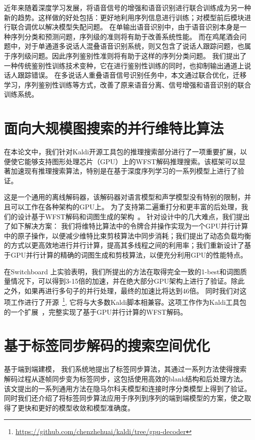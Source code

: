 近年来随着深度学习发展，将语音信号的增强和语音识别进行联合训练成为另一种新的趋势。这样做的好处包括：更好地利用序列信息进行训练；对模型前后模块进行联合调优以解决模型失配问题。
%
在单输出语音识别中，由于语音识别本身是一种序列分类和预测问题，序列级的准则将有助于改善系统性能。
而在鸡尾酒会问题中，对于单通道多说话人混叠语音识别系统，则又包含了说话人跟踪问题，也属于序列级问题。因此序列鉴别性准则将有助于这样的序列分类问题。
我们提出了一种传统鉴别性训练技术变种，它在进行鉴别性训练的同时，也抑制输出通道上说话人跟踪错误。
在多说话人重叠语音信号识别任务中，本文通过联合优化，迁移学习，序列鉴别性训练等方式，改善了原来语音分离、信号增强和语音识别的联合训练系统。


\section{面向大规模图搜索的并行维特比算法}
\label{chap:sum-gpu}

在本论文中，我们针对Kaldi开源工具包的推理搜索部分进行了一项重要扩展，以便使它能够支持图形处理芯片（GPU）上的WFST解码推理搜索。该框架可以显著加速现有推理搜索算法，特别是在基于深度序列学习的一系列模型上进行了验证。

这是一个通用的离线解码器，该解码器对语言模型和声学模型没有特别的限制，并且可以工作在各种架构的GPU上。
为了支持第二遍重打分和更丰富的后处理，我们的设计基于WFST解码和词图生成的架构~\cite{povey2012generating}。
针对设计中的几大难点，我们提出了如下解决方案：
我们将维特比算法中的令牌合并操作实现为一个GPU并行计算中的原子操作，以便减少维特比束剪枝算法中同步消耗；我们提出了动态负载均衡的方式以更高效地进行并行计算，提高其多线程之间的利用率；我们重新设计了基于GPU并行计算的精确的词图生成和剪枝算法，以便充分利用GPU的性能特点。


在Switchboard 上实验表明，我们所提出的方法在取得完全一致的1-best和词图质量情况下，可以得到3-15倍的加速，并在绝大部分GPU架构上进行了验证。除此之外，如果再进行多句子的并行处理，最终的加速比将达到46倍。
同时我们对这项工作进行了开源~\footnote{\url{https://github.com/chenzhehuai/kaldi/tree/gpu-decoder}},
它将与大多数Kaldi脚本相兼容。这项工作作为Kaldi工具包的一个扩展~\cite{povey2011kaldi}，完整实现了基于GPU并行计算的WFST解码。



\section{基于标签同步解码的搜索空间优化}
\label{chap:sum-lsd}

基于端到端建模，
我们系统地提出了标签同步算法，其通过一系列方法使得搜索解码过程从逐帧同步变为标签同步，这包括使用高效的blank结构和后处理方法。该文提出的一系列通用方法在隐马尔科夫模型和连接时序分类模型上得到了验证。同时我们还介绍了将标签同步算法应用于序列到序列的端到端模型的方案，使之取得了更快和更好的模型收敛和模型准确度。


